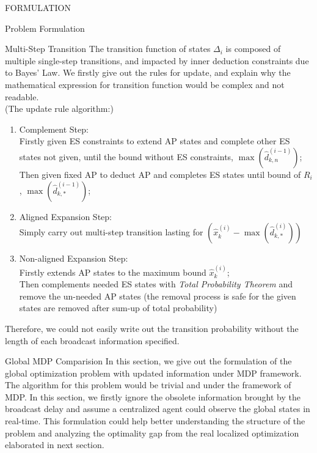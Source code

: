 \documentclass[10pt, conference, letterpaper]{IEEEtran}
\begin{document}
\begin{section}{FORMULATION}
\begin{subsection}{Problem Formulation}
\begin{subsubsection}{Multi-Step Transition}
                The transition function of states $\Delta_i$ is composed of multiple single-step transitions, and impacted by inner deduction constraints due to Bayes' Law. We firstly give out the rules for update, and explain why the mathematical expression for transition function would be complex and not readable.
                \\
                (The update rule algorithm:)
                \begin{enumerate}
                    \item Complement Step: \\
                    Firstly given ES constraints to extend AP states and complete other ES states not given, until the bound without ES constraints, $\max(\hat{d}_{k,n}^{(i-1)})$;\\
                    Then given fixed AP to deduct AP and completes ES states until bound of $R_i$, $\max(\hat{d}^{(i-1)}_{k,*})$;
                    \item Aligned Expansion Step: \\
                    Simply carry out multi-step transition lasting for $( \hat{x}^{(i)}_k - \max(\hat{d}^{(i)}_{k,*}) )$
                    \item Non-aligned Expansion Step: \\
                    Firstly extends AP states to the maximum bound $\hat{x}^{(i)}_k$; \\
                    Then complements needed ES states with \emph{Total Probability Theorem} and remove the un-needed AP states (the removal process is safe for the given states are removed after sum-up of total probability)
                \end{enumerate}
                Therefore, we could not easily write out the transition probability without the length of each broadcast information specified.
            \end{subsubsection}

        \end{subsection}

        \begin{subsection}{Global MDP Comparision}
            In this section, we give out the formulation of the global optimization problem with updated information under MDP framework. The algorithm for this problem would be trivial and 
            under the framework of MDP. In this section, we firstly ignore the obsolete information brought by the broadcast delay and assume a centralized agent could observe the global states in real-time. This formulation could help better understanding the structure of the problem and analyzing the optimality gap from the real localized optimization elaborated in next section.


\end{subsection}
\end{section}
\end{document}

